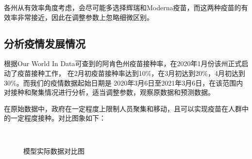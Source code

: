 \documentclass[withoutpreface,bwprint]{cumcmthesis} %
\begin{document}
各州从有效率角度考虑，会尽可能多选择辉瑞和Moderna疫苗，而这两种疫苗的有效率非常接近，因此在调整参数上忽略细微区别。

\clearpage
\subsection{分析疫情发展情况}
根据Our World In Data可查到的阿肯色州疫苗接种率，在2020年1月份该州正式启动了疫苗接种工作，
在2月初疫苗接种率达到10\%，在3月初达到20\%，4月初达到30\%。而我们的疫情数据起始日期是
2020年3月6日至2021年3月6日，在该范围内对接种和聚集情况进行分析，适当调整参数，观察原数据和预测数据。

在原始数据中，政府在一定程度上限制人员聚集和移动，且可以实现疫苗在人群中的一定程度接种。对比图象如下：
\begin{figure}[!htb]
    \centering
    \hfill
     \\
    \hfill
    \caption{模型实际数据对比图}
\end{figure}
\end{document}
